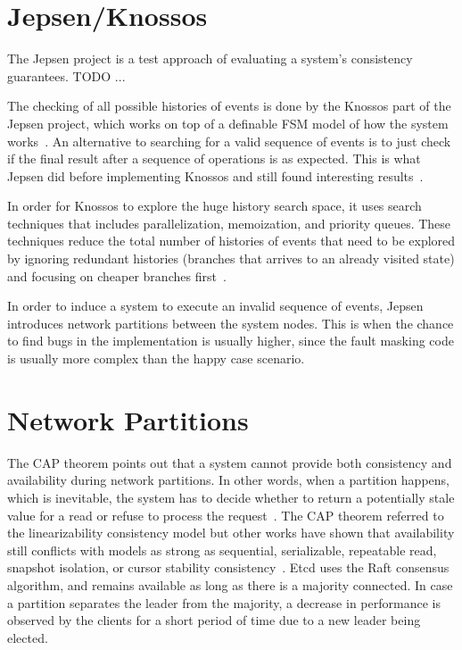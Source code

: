 \documentclass[12pt,conference]{IEEEtran}
\begin{document}
\section{Jepsen/Knossos}

The Jepsen project is a test approach of evaluating a system's consistency guarantees. TODO ...

The checking of all possible histories of events is done by the Knossos part of the Jepsen project, which works on top of a definable FSM model of how the system works~\cite{knossosPostWebsite}. An alternative to searching for a valid sequence of events is to just check if the final result after a sequence of operations is as expected. This is what Jepsen did before implementing Knossos and still found interesting results~\cite{jepsenWebsite}.

In order for Knossos to explore the huge history search space, it uses search techniques that includes parallelization, memoization, and priority queues. These techniques reduce the total number of histories of events that need to be explored by ignoring redundant histories (branches that arrives to an already visited state) and focusing on cheaper branches first~\cite{knossosPostWebsite2}.

In order to induce a system to execute an invalid sequence of events, Jepsen introduces network partitions between the system nodes. This is when the chance to find bugs in the implementation is usually higher, since the fault masking code is usually more complex than the happy case scenario.

\section{Network Partitions}

The CAP theorem points out that a system cannot provide both consistency and availability during network partitions. In other words, when a partition happens, which is inevitable, the system has to decide whether to return a potentially stale value for a read or refuse to process the request~\cite{brewer2012cap}. The CAP theorem referred to the linearizability consistency model but other works have shown that availability still conflicts with models as strong as sequential, serializable, repeatable read, snapshot isolation, or cursor stability consistency~\cite{strongConsistencyWebsite,bailis2013hat}. Etcd uses the Raft consensus algorithm, and remains available as long as there is a majority connected. In case a partition separates the leader from the majority, a decrease in performance is observed by the clients for a short period of time due to a new leader being elected.
\end{document}
